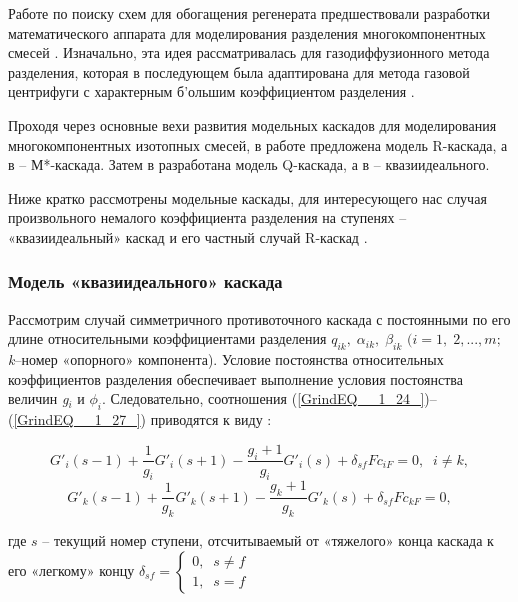 Работе по поиску схем для обогащения регенерата предшествовали разработки математического аппарата для моделирования разделения многокомпонентных смесей \cite{delagarzaMulticomponentIsotopeSeparation1961}.
Изначально, эта идея рассматривалась для газодиффузионного метода разделения, которая в последующем была адаптирована для метода газовой центрифуги с характерным б'ольшим коэффициентом разделения \cite{yamamotoMulticomponentIsotopeSeparating1978}.

Проходя через основные вехи развития модельных каскадов для моделирования многокомпонентных изотопных смесей, в работе \cite{delagarzaMulticomponentIsotopeSeparation1961} предложена модель R-каскада, а в \cite{levin1963} -- М*-каскада.
Затем в \cite{kolokoltsovDesignCascadesSeparating1970} разработана модель Q-каскада, а в \cite{sazykinKvaziidealnyeKaskadyDlya2000} -- квазиидеального.

Ниже кратко рассмотрены модельные каскады, для интересующего нас случая произвольного немалого коэффициента разделения на ступенях -- «квазиидеальный» каскад и его частный случай R-каскад \cite{sazykinKvaziidealnyeKaskadyDlya2000}.

\subsubsection{Модель «квазиидеального» каскада}

Рассмотрим случай симметричного противоточного каскада с постоянными по его длине относительными коэффициентами разделения $q_{ik} ,\; \alpha _{ik} ,\; \beta _{ik} $ $(i=1,\; 2,...,m;$ \textit{k}--номер «опорного» компонента). Условие постоянства относительных коэффициентов разделения обеспечивает выполнение условия постоянства величин \textit{g${}_{i}$} и $\phi _{i} $. Следовательно, соотношения (\ref{GrindEQ__1_24_})--(\ref{GrindEQ__1_27_}) приводятся к виду \cite{sulaberidzeTeoriyaKaskadovDlya2011}:

\begin{equation} \label{GrindEQ__1_52_} 
  G'_{i} (s-1)+\frac{1}{g_{i} } G'_{i} (s+1)-\frac{g_{i} +1}{g_{i} } G'_{i} (s)+\delta _{sf} Fc_{iF} =0,\; \; i\ne k, 
  \end{equation} 
  \begin{equation} \label{GrindEQ__1_53_} 
  G'_{k} (s-1)+\frac{1}{g_{k} } G'_{k} (s+1)-\frac{g_{k} +1}{g_{k} } G'_{k} (s)+\delta _{sf} Fc_{kF} =0, 
  \end{equation}

где $s$ – текущий номер ступени, отсчитываемый от «тяжелого» конца каскада к его «легкому» концу $\delta _{sf} =\left\{\begin{array}{l} {0,\; \; s\ne f} \\ {1,\; \; s=f} \end{array}\right. $

